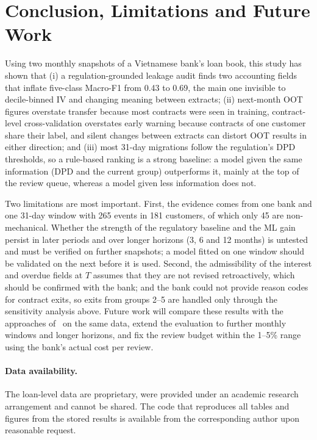 \documentclass[runningheads]{llncs}
\begin{document}
\section{Conclusion, Limitations and Future Work}
\label{sec:conclusion}

Using two monthly snapshots of a Vietnamese bank's loan book, this study has shown that (i) a regulation-grounded leakage audit finds two accounting fields that inflate five-class Macro-F1 from 0.43 to 0.69, the main one invisible to decile-binned IV and changing meaning between extracts; (ii) next-month OOT figures overstate transfer because most contracts were seen in training, contract-level cross-validation overstates early warning because contracts of one customer share their label, and silent changes between extracts can distort OOT results in either direction; and (iii) most 31-day migrations follow the regulation's DPD thresholds, so a rule-based ranking is a strong baseline: a model given the same information (DPD and the current group) outperforms it, mainly at the top of the review queue, whereas a model given less information does not.

Two limitations are most important. First, the evidence comes from one bank and one 31-day window with 265 events in 181 customers, of which only 45 are non-mechanical. Whether the strength of the regulatory baseline and the ML gain persist in later periods and over longer horizons (3, 6 and 12 months) is untested and must be verified on further snapshots; a model fitted on one window should be validated on the next before it is used. Second, the admissibility of the interest and overdue fields at $T$ assumes that they are not revised retroactively, which should be confirmed with the bank; and the bank could not provide reason codes for contract exits, so exits from groups 2--5 are handled only through the sensitivity analysis above. Future work will compare these results with the approaches of~\cite{nguyen2025boosting,nguyen2024ews} on the same data, extend the evaluation to further monthly windows and longer horizons, and fix the review budget within the 1--5\% range using the bank's actual cost per review.

\paragraph{Data availability.} The loan-level data are proprietary, were provided under an academic research arrangement and cannot be shared. The code that reproduces all tables and figures from the stored results is available from the corresponding author upon reasonable request.
\end{document}

